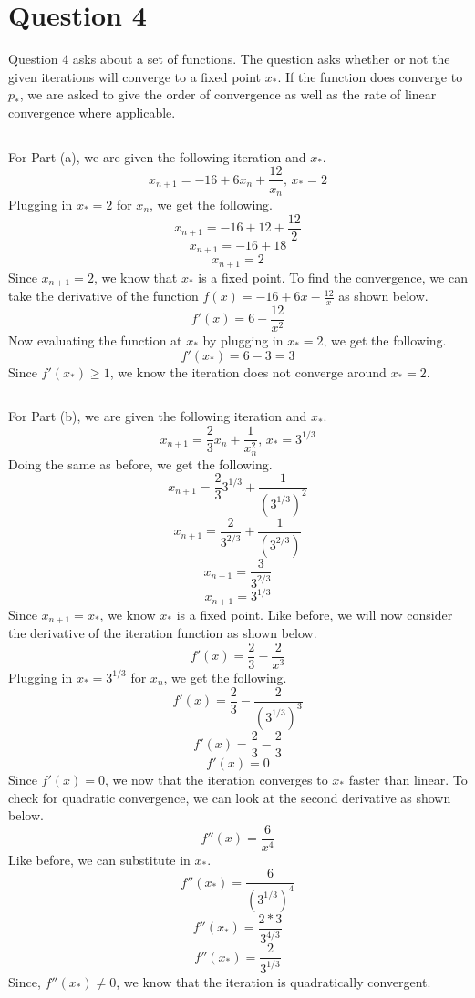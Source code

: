 \documentclass{article}
\theoremstyle{theorem}
\begin{document}
\section{Question 4}
Question 4 asks about a set of functions. The question asks whether or not the given iterations will converge to a fixed point \(x_*\). If the function does converge to \(p_*\), we are asked to give the order of convergence as well as the rate of linear convergence where applicable.
\subsection{}
For Part (a), we are given the following iteration and \(x_*\).
\[
x_{n+1} = -16 +6x_n+\frac{12}{x_n} \mbox{, }x_*=2
\]
Plugging in \(x_*=2\) for \(x_n\), we get the following.
\[
x_{n+1} = -16 +12+\frac{12}{2}
\]
\[
x_{n+1} = -16 +18
\]
\[
x_{n+1} = 2
\]
Since \(x_{n+1} = 2\), we know that \(x_*\) is a fixed point. To find the convergence, we can take the derivative of the function \(f(x)=-16+6x-\frac{12}{x}\) as shown below.
\[
f'(x) = 6-\frac{12}{x^2}
\]
Now evaluating the function at \(x_*\) by plugging in \(x_*=2\), we get the following.
\[
f'(x_*)=6-3 = 3
\]
Since \(f'(x_*) \geq 1\), we know the iteration does not converge around \(x_*=2\).

\subsection{}
For Part (b), we are given the following iteration and \(x_*\).
\[
x_{n+1}=\frac{2}{3}x_n+\frac{1}{x_n^2} \mbox{, } x_*=3^{1/3}
\]
Doing the same as before, we get the following.
\[
x_{n+1}=\frac{2}{3}3^{1/3}+\frac{1}{(3^{1/3})^2}
\]
\[
x_{n+1}=\frac{2}{3^{2/3}}+\frac{1}{(3^{2/3})}
\]
\[
x_{n+1}=\frac{3}{3^{2/3}}
\]
\[
x_{n+1}=3^{1/3}
\]
Since \(x_{n+1} = x_*\), we know \(x_*\) is a fixed point. Like before, we will now consider the derivative of the iteration function as shown below.
\[
f'(x) = \frac{2}{3} - \frac{2}{x^3}
\]
Plugging in \(x_*=3^{1/3}\) for \(x_n\), we get the following.
\[
f'(x) = \frac{2}{3} - \frac{2}{(3^{1/3})^3}
\]
\[
f'(x) = \frac{2}{3} - \frac{2}{3}
\]
\[
f'(x) = 0
\]
Since \(f'(x) = 0\), we now that the iteration converges to \(x_*\) faster than linear. To check for quadratic convergence, we can look at the second derivative as shown below.
\[
f''(x) = \frac{6}{x^4}
\]
Like before, we can substitute in \(x_*\).
\[
f''(x_*)=\frac{6}{(3^{1/3})^4}
\]
\[
f''(x_*)=\frac{2*3}{3^{4/3}}
\]
\[
f''(x_*)=\frac{2}{3^{1/3}}
\]
Since, \(f''(x_*)\neq0\), we know that the iteration is quadratically convergent.
\end{document}

